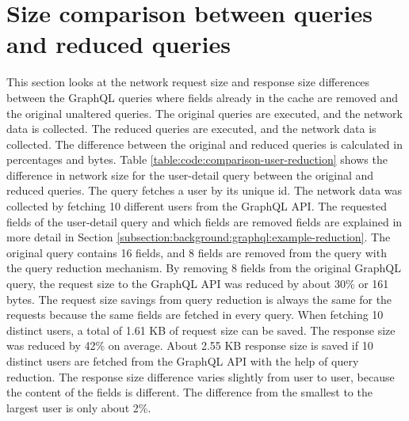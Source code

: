 \section{Size comparison between queries and reduced queries}

This section looks at the network request size and response size differences between the GraphQL queries where fields already in the cache are removed and the original unaltered queries. The original queries are executed, and the network data is collected. The reduced queries are executed, and the network data is collected. The difference between the original and reduced queries is calculated in percentages and bytes. Table \ref{table:code:comparison-user-reduction} shows the difference in network size for the user-detail query between the original and reduced queries. The query fetches a user by its unique id. The network data was collected by fetching 10 different users from the GraphQL \ac{API}. The requested fields of the user-detail query and which fields are removed fields are explained in more detail in Section \ref{subsection:background:graphql:example-reduction}. The original query contains 16 fields, and 8 fields are removed from the query with the query reduction mechanism. By removing 8 fields from the original GraphQL query, the request size to the GraphQL \ac{API} was reduced by about 30\% or 161 bytes. The request size savings from query reduction is always the same for the requests because the same fields are fetched in every query. When fetching 10 distinct users, a total of 1.61 KB of request size can be saved. The response size was reduced by 42\% on average. About 2.55 KB response size is saved if 10 distinct users are fetched from the GraphQL \ac{API} with the help of query reduction. The response size difference varies slightly from user to user, because the content of the fields is different. The difference from the smallest to the largest user is only about 2\%.

